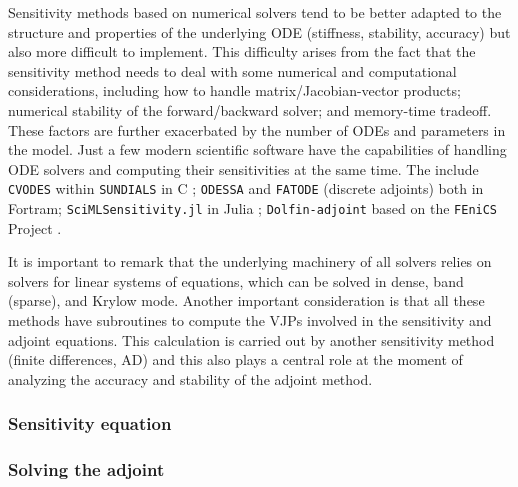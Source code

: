 Sensitivity methods based on numerical solvers tend to be better adapted to the structure and properties of the underlying ODE (stiffness, stability, accuracy) but also more difficult to implement.  
This difficulty arises from the fact that the sensitivity method needs to deal with some numerical and computational considerations, including how to handle matrix/Jacobian-vector products; numerical stability of the forward/backward solver; and memory-time tradeoff. 
These factors are further exacerbated by the number of ODEs and parameters in the model. 
Just a few modern scientific software have the capabilities of handling ODE solvers and computing their sensitivities at the same time. 
The include \texttt{CVODES} within \texttt{SUNDIALS} in C \cite{serban2005cvodes, SUNDIALS-hindmarsh2005sundials}; \texttt{ODESSA} \cite{ODESSA} and \texttt{FATODE} (discrete adjoints) \cite{FATODE2014} both in Fortram; \texttt{SciMLSensitivity.jl} in Julia \cite{rackauckas2020universal}; \texttt{Dolfin-adjoint} based on the \texttt{FEniCS} Project \cite{dolfin2013, dolfin2018}. 

It is important to remark that the underlying machinery of all solvers relies on solvers for linear systems of equations, which can be solved in dense, band (sparse), and Krylow mode. 
Another important consideration is that all these methods have subroutines to compute the VJPs involved in the sensitivity and adjoint equations. 
This calculation is carried out by another sensitivity method (finite differences, AD) and this also plays a central role at the moment of analyzing the accuracy and stability of the adjoint method. 

\subsubsection{Sensitivity equation}

\subsubsection{Solving the adjoint}


